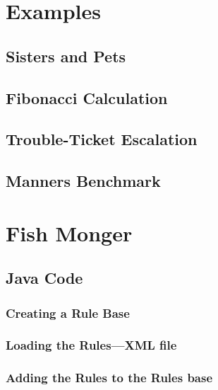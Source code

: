 \chapter{Examples}

\section{Sisters and Pets}

\section{Fibonacci Calculation}

\section{Trouble-Ticket Escalation}

\section{Manners Benchmark}



\chapter{Fish Monger}
\section{Java Code}
\subsection{Creating a Rule Base}

\subsection{Loading the Rules---XML file}

\subsection{Adding the Rules to the Rules base}

